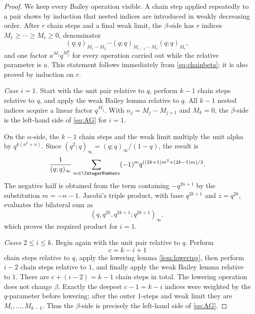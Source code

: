 \documentclass[11pt]{article}
\numberwithin{equation}{section}
\theoremstyle{definition}
\theoremstyle{remark}
\begin{document}
\begin{proof}
We keep every Bailey operation visible.  A chain step applied repeatedly to a
pair shows by induction that nested indices are introduced in weakly
decreasing order.  After $r$ chain steps and a final weak limit, the
$\beta$-side has $r$ indices
$M_1\ge\cdots\ge M_r\ge0$, denominator
\[
(q;q)_{M_1-M_2}\cdots(q;q)_{M_{r-1}-M_r}(q;q)_{M_r},
\]
and one factor $a^{M_j}q^{M_j^2}$ for every operation carried out while the
relative parameter is $a$.  This statement follows immediately from
\eqref{eq:chainbeta}; it is also proved by induction on $r$.

\smallskip
\noindent\emph{Case $i=1$.}
Start with the unit pair relative to $q$, perform $k-1$ chain steps relative
to $q$, and apply the weak Bailey lemma relative to $q$.  All $k-1$ nested
indices acquire a linear factor $q^{M_j}$.  With
$n_j=M_j-M_{j+1}$ and $M_k=0$, the $\beta$-side is the left-hand side of
\eqref{eq:AG} for $i=1$.

On the $\alpha$-side, the $k-1$ chain steps and the weak limit multiply the
unit alpha by $q^{k(n^2+n)}$.  Since
$(q^2;q)_\infty=(q;q)_\infty/(1-q)$, the result is
\begin{align*}
\frac1{(q;q)_\infty}
\sum_{m\in\IntegerNumbers}(-1)^m
q^{((2k+1)m^2+(2k-1)m)/2}.
\end{align*}
The negative half is obtained from the term containing
$-q^{2n+1}$ by the substitution $m=-n-1$.  Jacobi's triple product, with
base $q^{2k+1}$ and $z=q^{2k}$, evaluates the bilateral sum as
\[
(q,q^{2k},q^{2k+1};q^{2k+1})_\infty,
\]
which proves the required product for $i=1$.

\smallskip
\noindent\emph{Cases $2\le i\le k$.}
Begin again with the unit pair relative to $q$.  Perform
\[
c=k-i+1
\]
chain steps relative to $q$, apply the lowering lemma
\cref{lem:lowering}, then perform $i-2$ chain steps relative to $1$, and
finally apply the weak Bailey lemma relative to $1$.  There are
$c+(i-2)=k-1$ chain steps in total.  The lowering operation does not change
$\beta$.  Exactly the deepest $c-1=k-i$ indices were weighted by the
$q$-parameter before lowering; after the outer $1$-steps and weak limit they
are $M_i,\ldots,M_{k-1}$.  Thus the $\beta$-side is precisely the left-hand
side of \eqref{eq:AG}.


\end{proof}
\end{document}
